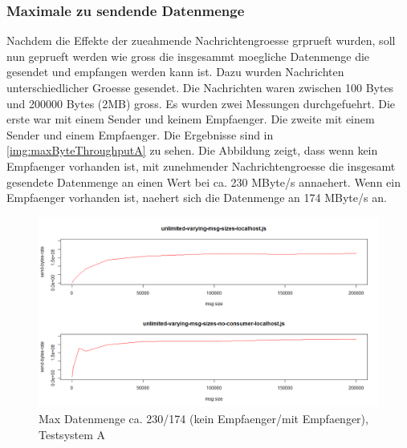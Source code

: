 \subsubsection{Maximale zu sendende Datenmenge}
\label{sec:maxthroughput}
Nachdem die Effekte der zueahmende Nachrichtengroesse grprueft wurden, soll nun geprueft werden wie gross die insgesammt moegliche Datenmenge die gesendet und empfangen werden kann ist. Dazu wurden Nachrichten unterschiedlicher Groesse gesendet. Die Nachrichten waren zwischen 100 Bytes und 200000 Bytes (2MB) gross. Es wurden zwei Messungen durchgefuehrt. Die erste war mit einem Sender und keinem Empfaenger. Die zweite mit einem Sender und einem Empfaenger. 
Die Ergebnisse sind in \autoref{img:maxByteThroughputA} zu sehen. Die Abbildung zeigt, dass wenn kein Empfaenger vorhanden ist, mit zunehmender Nachrichtengroesse die insgesamt gesendete Datenmenge an einen Wert bei ca. 230 MByte/s annaehert. Wenn ein Empfaenger vorhanden ist, naehert sich die Datenmenge an 174 MByte/s an.
\begin{figure}
\center
  \includegraphics[width=1\textwidth]{images/max-byte-throughput-A.png}
  \caption{Max Datenmenge ca. 230/174 (kein Empfaenger/mit Empfaenger), Testsystem A}
  \label{img:maxByteThroughputA}
\end{figure}

